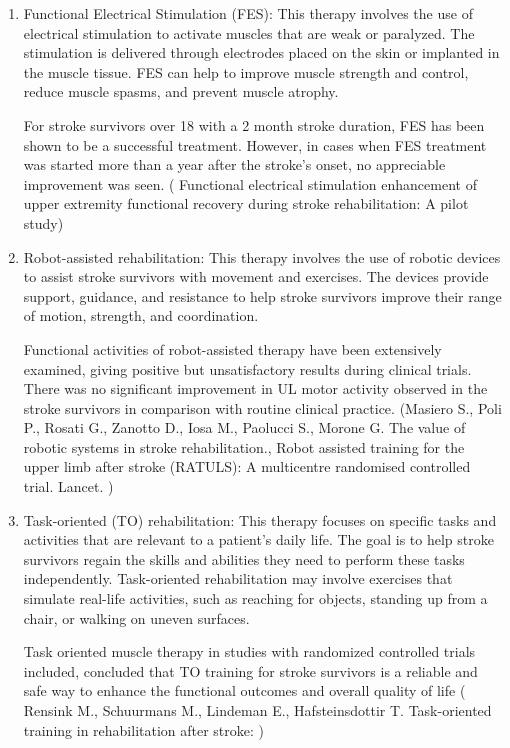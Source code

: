 \begin{enumerate}

    \item Functional Electrical Stimulation (FES): This therapy involves the use of electrical stimulation to activate muscles that are weak or paralyzed. The stimulation is delivered through electrodes placed on the skin or implanted in the muscle tissue. FES can help to improve muscle strength and control, reduce muscle spasms, and prevent muscle atrophy. 

    For stroke survivors over 18 with a 2 month stroke duration, FES has been shown to be a successful treatment. However, in cases when FES treatment was started more than a year after the stroke's onset, no appreciable improvement was seen.  ( Functional electrical stimulation enhancement of upper extremity functional recovery during stroke rehabilitation: A pilot study)
    
    \item Robot-assisted rehabilitation: This therapy involves the use of robotic devices to assist stroke survivors with movement and exercises. The devices provide support, guidance, and resistance to help stroke survivors improve their range of motion, strength, and coordination.
    
    Functional activities of robot-assisted therapy have been extensively examined, giving positive but unsatisfactory results during clinical trials. There was no significant improvement in UL motor activity observed in the stroke survivors in comparison with routine clinical practice.  (Masiero S., Poli P., Rosati G., Zanotto D., Iosa M., Paolucci S., Morone G. The value of robotic systems in stroke rehabilitation., Robot assisted training for the upper limb after stroke (RATULS): A multicentre randomised controlled trial. Lancet. )

    \item Task-oriented (TO) rehabilitation: This therapy focuses on specific tasks and activities that are relevant to a patient's daily life. The goal is to help stroke survivors regain the skills and abilities they need to perform these tasks independently. Task-oriented rehabilitation may involve exercises that simulate real-life activities, such as reaching for objects, standing up from a chair, or walking on uneven surfaces.

    Task oriented muscle therapy in studies with randomized controlled trials included, concluded that TO training for stroke survivors is a reliable and safe way to enhance the functional outcomes and overall quality of life ( Rensink M., Schuurmans M., Lindeman E., Hafsteinsdottir T. Task-oriented training in rehabilitation after stroke: )
    


    
\end{enumerate}


